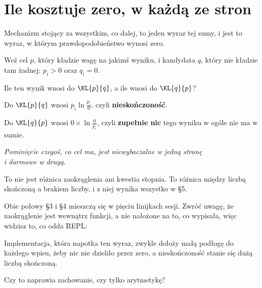 \section{Ile kosztuje zero, w każdą ze stron}
\label{sec:P30-zero}

\begin{fr}
Mechanizm stojący za wszystkim, co dalej, to jeden wyraz tej sumy, i jest to
wyraz, w którym prawdopodobieństwo wynosi zero.

Weź cel $p$, który kładzie wagę na jakimś wyniku, i kandydata $q$, który nie
kładzie tam żadnej: $p_i > 0$ oraz $q_i = 0$.

Ile ten wynik wnosi do $\KL{p}{q}$, a ile wnosi do $\KL{q}{p}$?
\dotline
\nextframe
\end{fr}

\begin{fr}
\begin{ansblock}
Do $\KL{p}{q}$ wnosi $p_i \ln \frac{p_i}{0}$, czyli
\textbf{nieskończoność}.

Do $\KL{q}{p}$ wnosi $0 \times \ln \frac{0}{p_i}$, czyli
\textbf{zupełnie nic} \dash{} tego wyniku w ogóle nie ma w sumie.
\end{ansblock}

\begin{center}
\emph{Pominięcie czegoś, co cel ma, jest niewybaczalne w jedną stronę\\
i darmowe w drugą.}
\end{center}

To nie jest różnica zaokrąglenia ani kwestia stopnia. To różnica między
liczbą skończoną a brakiem liczby, i z niej wynika wszystko w §5.

Obie połowy §3 i §4 mieszczą się w pięciu linijkach sesji. Zwróć uwagę, że
zaokrąglenie jest wewnątrz funkcji, a nie nałożone na to, co wypisała, więc
widzisz to, co odda REPL:


\end{fr}

\begin{fr}
Implementacja, która napotka ten wyraz, zwykle dołoży małą podłogę do
każdego wpisu, żeby nic nie dzieliło przez zero, a nieskończoność stanie się
dużą liczbą skończoną.

Czy to naprawia zachowanie, czy tylko arytmetykę?
\dotline
\nextframe
\end{fr}

